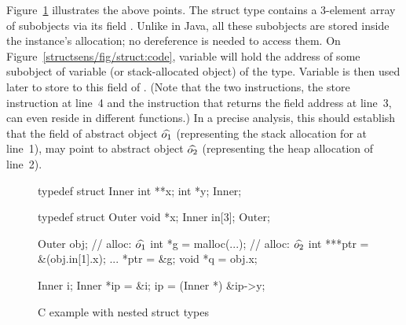\noindent Figure~\ref{structsens/fig/struct} illustrates the above points.
The  struct type contains a 3-element array of
 subobjects via its field . Unlike in Java, all
these subobjects are stored inside the  instance's
allocation; no dereference is needed to access them. On
Figure~\ref{structsens/fig/struct:code}, variable  will hold
the address of some subobject of variable (or stack-allocated object)
 of the  type. Variable  is then used
later to store to this field of . (Note that the two
instructions, the store instruction at line~4 and the instruction that
returns the field address at line~3, can even reside in different
functions.) In a precise analysis, this should establish that the
 field of abstract object $\widehat{o_1}$ (representing
the stack allocation for  at line~1), may point to abstract
object $\widehat{o_2}$ (representing the heap allocation of line~2).


\begin{figure}
  \begin{minipage}[b]{.5\linewidth}
    \centering\large
\begin{lcppcode}
typedef struct Inner {
   int **x;
   int *y;
} Inner;

typedef struct Outer {
   void *x;
   Inner in[3];
} Outer;
\end{lcppcode}
    \label{structsens/fig/struct:decl}
  \end{minipage}%
  \begin{minipage}[b]{.5\linewidth}
    \centering\large
\begin{lcppcode}
Outer obj;            // alloc: $\widehat{o_1}$
int *g = malloc(...); // alloc: $\widehat{o_2}$
int ***ptr = &(obj.in[1].x); ...
*ptr = &g;
void *q = obj.x;
\end{lcppcode}
    \label{structsens/fig/struct:code}\par\vfill
\begin{lcppcode}
Inner i;
Inner *ip = &i;
ip = (Inner *) &ip->y;
\end{lcppcode}
    \label{structsens/fig/struct:pwc}
  \end{minipage}
  \caption{C example with nested struct types}
  \label{structsens/fig/struct}
\end{figure}

